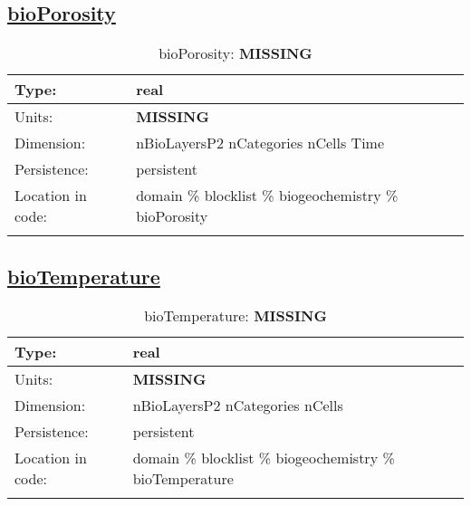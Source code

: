 \subsection[bioPorosity]{\hyperref[sec:var_tab_biogeochemistry]{bioPorosity}}
\label{subsec:var_sec_biogeochemistry_bioPorosity}
\begin{center}
\begin{longtable}{| p{2.0in} | p{4.0in} |}
        \hline 
        Type: & real \\
        \hline 
        Units: & {\bf \color{red} MISSING} \\
        \hline 
        Dimension: & nBioLayersP2 nCategories nCells Time \\
        \hline 
        Persistence: & persistent \\
        \hline 
         Location in code: & domain \% blocklist \% biogeochemistry \% bioPorosity \\
         \hline 
    \caption{bioPorosity: {\bf \color{red} MISSING}}
\end{longtable}
\end{center}
\subsection[bioTemperature]{\hyperref[sec:var_tab_biogeochemistry]{bioTemperature}}
\label{subsec:var_sec_biogeochemistry_bioTemperature}
\begin{center}
\begin{longtable}{| p{2.0in} | p{4.0in} |}
        \hline 
        Type: & real \\
        \hline 
        Units: & {\bf \color{red} MISSING} \\
        \hline 
        Dimension: & nBioLayersP2 nCategories nCells \\
        \hline 
        Persistence: & persistent \\
        \hline 
         Location in code: & domain \% blocklist \% biogeochemistry \% bioTemperature \\
         \hline 
    \caption{bioTemperature: {\bf \color{red} MISSING}}
\end{longtable}
\end{center}
